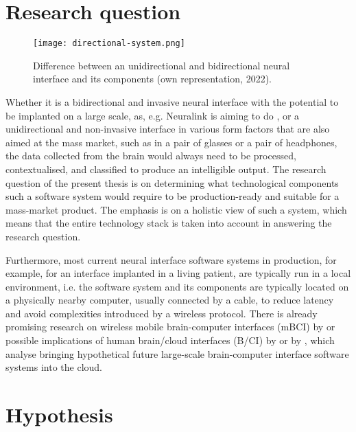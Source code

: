 \section{Research question}
\label{chapter1-research-question}

\begin{figure}[ht]
  \centering
  \texttt{[image: directional-system.png]}
  \caption{Difference between an unidirectional and bidirectional neural interface and its components (own representation, 2022).}
  \label{fig:directional-system}
\end{figure}

Whether it is a bidirectional and invasive neural interface with the potential to be implanted on a large scale, as, e.g. Neuralink is aiming to do \citep{urban_neuralink_2017}, or a unidirectional and non-invasive interface in various form factors that are also aimed at the mass market, such as in a pair of glasses or a pair of headphones, the data collected from the brain would always need to be processed, contextualised, and classified to produce an intelligible output. The research question of the present thesis is on determining what technological components such a software system would require to be production-ready and suitable for a mass-market product. The emphasis is on a holistic view of such a system, which means that the entire technology stack is taken into account in answering the research question.

Furthermore, most current neural interface software systems in production, for example, for an interface implanted in a living patient, are typically run in a local environment, i.e. the software system and its components are typically located on a physically nearby computer, usually connected by a cable, to reduce latency and avoid complexities introduced by a wireless protocol. There is already promising research on wireless mobile brain-computer interfaces (mBCI) by \citeauthor{minguillon_mobile_2017} \citeyearpar{minguillon_mobile_2017} or possible implications of human brain/cloud interfaces (B/CI) by \citeauthor{martins_human_2019} \citeyearpar{martins_human_2019} or by \citeauthor{angelica_cognitive_2021} \citeyearpar{angelica_cognitive_2021}, which analyse bringing hypothetical future large-scale brain-computer interface software systems into the cloud.

\section{Hypothesis}
\label{chapter1-hypothesis}

